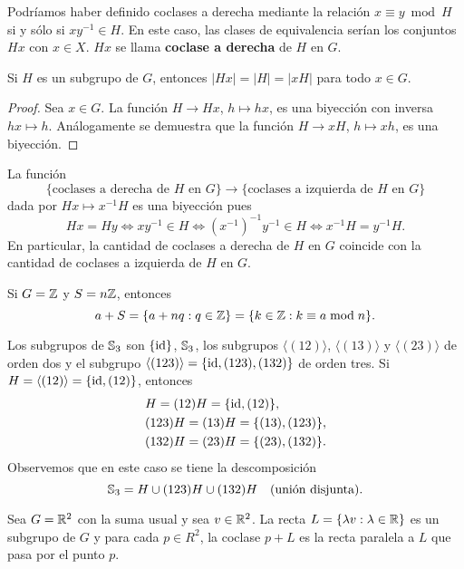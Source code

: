 Podríamos haber definido coclases a derecha mediante la relación $x\equiv
y\bmod H$ si y sólo si $xy^{-1}\in H$. En este caso, las clases de equivalencia
serían los conjuntos $Hx$ con $x\in X$. $Hx$ se llama \textbf{coclase a derecha}
de $H$ en $G$. 

\begin{proposition}
	Si $H$ es un subgrupo de $G$, entonces $|Hx|=|H|=|xH|$ para todo $x\in G$. 
\end{proposition}

\begin{proof}
	Sea $x\in G$. La función $H\to Hx$, $h\mapsto hx$, es una biyección con
	inversa $hx\mapsto h$. Análogamente se demuestra que la función $H\to xH$,
	$h\mapsto xh$, es una biyección. 
\end{proof}

La función
\[
	\{\text{coclases a derecha de $H$ en $G$}\}\to\{\text{coclases a izquierda de $H$ en $G$}\}
\]
dada por $Hx\mapsto x^{-1}H$ es una biyección pues 
\[
	Hx=Hy
	\Longleftrightarrow xy^{-1}\in H
	\Longleftrightarrow (x^{-1})^{-1}y^{-1}\in H
	\Longleftrightarrow x^{-1}H=y^{-1}H.
\]
En particular, la cantidad de coclases a derecha de $H$ en $G$ coincide con la
cantidad de coclases a izquierda de $H$ en $G$.

\begin{example}
Si $G=\mathbb{Z}$ y $S=n\mathbb{Z}$, entonces
\[
a+S=\{a+nq:q\in\mathbb{Z}\}=\{k\in\mathbb{Z}:k\equiv a\bmod n\}.
\]	
\end{example}

\begin{example}
Los subgrupos de $\mathbb{S}_3$ son $\{\operatorname{id}\}$, $\mathbb{S}_3$, los subgrupos $\langle(12)\rangle$, $\langle(13)\rangle$ y $\langle(23)\rangle$ de orden dos 
y el subgrupo $\langle(123)\rangle=\{\operatorname{id},(123),(132)\}$ de orden tres.  	Si $H=\langle(12)\rangle=\{\operatorname{id},(12)\}$, entonces
\begin{align*}
&H=(12)H=\{\operatorname{id},(12)\},\\
&(123)H=(13)H=\{(13),(123)\},\\
&(132)H=(23)H=\{(23),(132)\}.
\end{align*}
Observemos que en este caso se tiene la descomposición
\[
\mathbb{S}_3=H\cup (123)H\cup (132)H\quad\text{(unión disjunta)}.
\]
\end{example}

\begin{example}
Sea $G=\mathbb{R}^2$ con la suma usual y sea $v\in\mathbb{R}^2$. La recta $L=\{\lambda v:\lambda\in\mathbb{R}\}$ es un subgrupo de $G$ y 
para cada $p\in R^2$, la coclase $p+L$ es la recta paralela a $L$ que pasa por el punto $p$.  	
\end{example}

